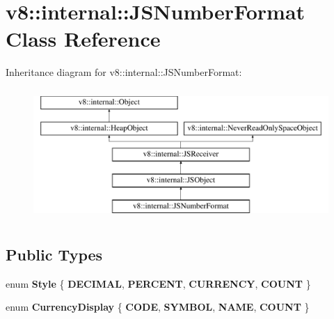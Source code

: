 \hypertarget{classv8_1_1internal_1_1JSNumberFormat}{}\section{v8\+:\+:internal\+:\+:J\+S\+Number\+Format Class Reference}
\label{classv8_1_1internal_1_1JSNumberFormat}
Inheritance diagram for v8\+:\+:internal\+:\+:J\+S\+Number\+Format\+:\begin{figure}[H]
\begin{center}
\leavevmode
\includegraphics[height=5.000000cm]{classv8_1_1internal_1_1JSNumberFormat}
\end{center}
\end{figure}
\subsection*{Public Types}
\begin{DoxyCompactItemize}
\item 
\mbox{\label{classv8_1_1internal_1_1JSNumberFormat_a233e4dace4876b4d3746fdbf9122d3fc}} 
enum {\bfseries Style} \{ {\bfseries D\+E\+C\+I\+M\+AL}, 
{\bfseries P\+E\+R\+C\+E\+NT}, 
{\bfseries C\+U\+R\+R\+E\+N\+CY}, 
{\bfseries C\+O\+U\+NT}
 \}
\item 
\mbox{\label{classv8_1_1internal_1_1JSNumberFormat_a0dd9bbb31abf795e3482177a564d996a}} 
enum {\bfseries Currency\+Display} \{ {\bfseries C\+O\+DE}, 
{\bfseries S\+Y\+M\+B\+OL}, 
{\bfseries N\+A\+ME}, 
{\bfseries C\+O\+U\+NT}
 \}
\end{DoxyCompactItemize}
